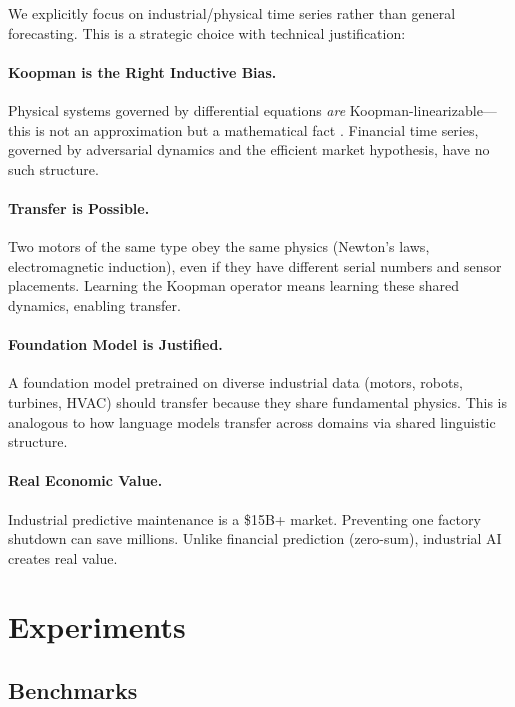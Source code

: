 \documentclass{article}
\begin{document}
We explicitly focus on industrial/physical time series rather than general forecasting. This is a strategic choice with technical justification:

\paragraph{Koopman is the Right Inductive Bias.} Physical systems governed by differential equations \emph{are} Koopman-linearizable—this is not an approximation but a mathematical fact \cite{koopman1931}. Financial time series, governed by adversarial dynamics and the efficient market hypothesis, have no such structure.

\paragraph{Transfer is Possible.} Two motors of the same type obey the same physics (Newton's laws, electromagnetic induction), even if they have different serial numbers and sensor placements. Learning the Koopman operator means learning these shared dynamics, enabling transfer.

\paragraph{Foundation Model is Justified.} A foundation model pretrained on diverse industrial data (motors, robots, turbines, HVAC) should transfer because they share fundamental physics. This is analogous to how language models transfer across domains via shared linguistic structure.

\paragraph{Real Economic Value.} Industrial predictive maintenance is a \$15B+ market. Preventing one factory shutdown can save millions. Unlike financial prediction (zero-sum), industrial AI creates real value.

\section{Experiments}

\subsection{Benchmarks}
\end{document}
